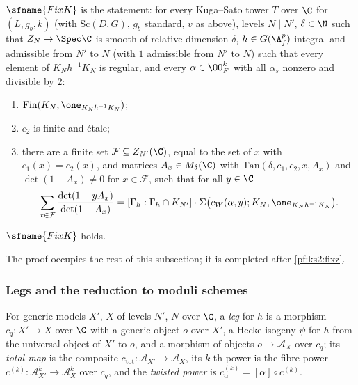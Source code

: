\begin{definition}\label{pf:ks2:def:fixk}
$\sfname{FixK}$ is the statement: for every
Kuga--Sato tower $T$ over $\C$ for $(L,g_b,k)$ (with $\mathrm{Sc}(D,G)$, $g_b$ standard, $v$ as
above), levels $N\mid N'$, $\delta\in\N$ such that $Z_N\to\Spec\C$ is smooth of relative dimension
$\delta$, $h\in\kstwoG$ integral and admissible from $N'$ to $N$ (with $1$ admissible from $N'$ to $N$)
such that every element of $K_Nh^{-1}K_N$ is regular, and every $\alpha\in\kstwoOF^k$ with all
$\alpha_s$ nonzero and divisible by $2$:
\begin{enumerate}
\item $\mathrm{Fin}(K_N,\one_{K_Nh^{-1}K_N})$;
\item $c_2$ is finite and \'etale;
\item there are a finite set $\mathcal F\subseteq Z_{N'}(\C)$, equal to the set of $x$ with
  $c_1(x)=c_2(x)$, and matrices $A_x\in M_\delta(\C)$ with $\mathrm{Tan}(\delta,c_1,c_2,x,A_x)$ and
  $\det(1-A_x)\ne0$ for $x\in\mathcal F$, such that for all $y\in\C$
\begin{equation}\label{pf:ks2:eq:fixk}
\sum_{x\in\mathcal F}\frac{\det(1-yA_x)}{\det(1-A_x)}=[\Gamma_h:\Gamma_h\cap K_{N'}]\cdot
\Sigma\bigl(c_W(\alpha,y);K_N,\one_{K_Nh^{-1}K_N}\bigr).
\end{equation}
\end{enumerate}
\end{definition}

\begin{theorem}\label{pf:ks2:fixk}
$\sfname{FixK}$ holds.
\end{theorem}

The proof occupies the rest of this subsection; it is completed after \cref{pf:ks2:fixz}.

\subsubsection{Legs and the reduction to moduli schemes}

For generic models $X'$, $X$ of levels $N'$, $N$ over $\C$, a \emph{leg} for $h$ is a morphism $c_q\colon X'\to X$ over $\C$ with a generic object
$o$ over $X'$, a Hecke isogeny $\psi$ for $h$ from the universal object of $X'$ to $o$, and a
morphism of objects $o\to\mathcal A_X$ over $c_q$; its \emph{total map} is the composite
$c_{\mathrm{tot}}\colon\mathcal A_{X'}\to\mathcal A_X$, its $k$-th power is the fibre power
$c^{(k)}\colon\mathcal A_{X'}^k\to\mathcal A_X^k$ over $c_q$, and the \emph{twisted power} is
$c^{(k)}_\alpha=[\alpha]\circ c^{(k)}$.

